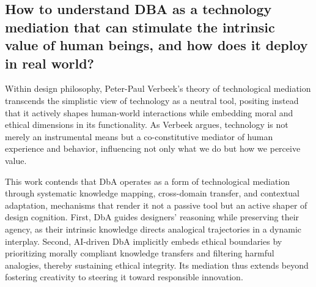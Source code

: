 



\subsection{How to understand DBA as a technology mediation that can stimulate the intrinsic value of human beings, and how does it deploy in real world?}



Within design philosophy, Peter-Paul Verbeek’s theory of technological mediation transcends the simplistic view of technology as a neutral tool, positing instead that it actively shapes human-world interactions while embedding moral and ethical dimensions in its functionality\cite{verbeek2006materializing}. As Verbeek argues, technology is not merely an instrumental means but a co-constitutive mediator of human experience and behavior, influencing not only what we do but how we perceive value\cite{verbeek2011moralizing}.

This work contends that DbA operates as a form of technological mediation through systematic knowledge mapping, cross-domain transfer, and contextual adaptation, mechanisms that render it not a passive tool but an active shaper of design cognition. First, DbA guides designers’ reasoning while preserving their agency, as their intrinsic knowledge directs analogical trajectories in a dynamic interplay\cite{chan2011benefits}. Second, AI-driven DbA implicitly embeds ethical boundaries by prioritizing morally compliant knowledge transfers and filtering harmful analogies, thereby sustaining ethical integrity. Its mediation thus extends beyond fostering creativity to steering it toward responsible innovation\cite{liao2021priming, smits2019values}.

